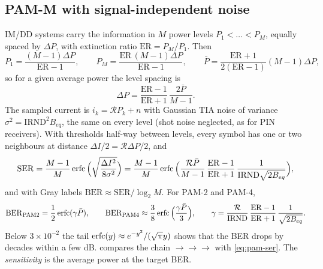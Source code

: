 \subsection{PAM-M with signal-independent noise}
IM/DD systems carry the information in $M$ power levels $P_1<\dots<P_M$, equally spaced by
$\Delta P$, with extinction ratio $\mathrm{ER}=P_M/P_1$. Then
\begin{equation}
  P_1=\frac{(M-1)\Delta P}{\mathrm{ER}-1},\qquad P_M=\frac{\mathrm{ER}\,(M-1)\Delta P}{\mathrm{ER}-1},\qquad
  \bar P=\frac{\mathrm{ER}+1}{2(\mathrm{ER}-1)}(M-1)\Delta P,
\end{equation}
so for a given average power the level spacing is
\begin{equation}
  \Delta P=\frac{\mathrm{ER}-1}{\mathrm{ER}+1}\,\frac{2\bar P}{M-1}.
\end{equation}
The sampled current is $i_k=\mathcal RP_k+n$ with Gaussian TIA noise of variance $\sigma^2=\mathrm{IRND}^2B_{eq}$,
the same on every level (shot noise neglected, as for PIN receivers). With thresholds half-way
between levels, every symbol has one or two neighbours at distance $\Delta I/2=\mathcal R\Delta P/2$, and
\begin{equation}
  \mathrm{SER}=\frac{M-1}{M}\operatorname{erfc}\Big(\sqrt{\frac{\Delta I^2}{8\sigma^2}}\Big)
  =\frac{M-1}{M}\operatorname{erfc}\Big(\frac{\mathcal R\bar P}{M-1}\,\frac{\mathrm{ER}-1}{\mathrm{ER}+1}\,\frac{1}{\mathrm{IRND}\sqrt{2B_{eq}}}\Big),
  \label{eq:pam-ser}
\end{equation}
and with Gray labels $\mathrm{BER}\approx\mathrm{SER}/\log_2M$. For PAM-2 and PAM-4,
\begin{equation}
  \mathrm{BER}_{\mathrm{PAM2}}=\frac12\operatorname{erfc}(\gamma\bar P),\qquad \mathrm{BER}_{\mathrm{PAM4}}\approx\frac38\operatorname{erfc}\Big(\frac{\gamma\bar P}{3}\Big),\qquad
  \gamma=\frac{\mathcal R}{\mathrm{IRND}}\,\frac{\mathrm{ER}-1}{\mathrm{ER}+1}\,\frac{1}{\sqrt{2B_{eq}}} .
\end{equation}
Below $3\times10^{-2}$ the tail $\operatorname{erfc}(y)\approx e^{-y^2}/(\sqrt\pi y)$ shows that the BER drops by decades within a few
dB.  compares the chain $\to$$\to$$\to$
with \cref{eq:pam-ser}. The \emph{sensitivity} is the average power at the target BER.

